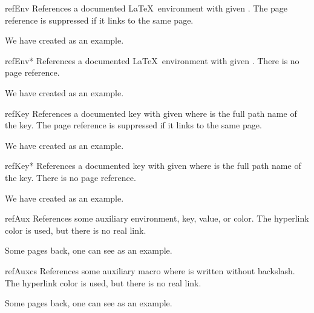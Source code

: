 \begin{docCommand}{refEnv}{}
  References a documented \LaTeX\ environment with given .
  The page reference is suppressed if it links to the same page.
\begin{dispExample}
We have created  as an example.
\end{dispExample}
\end{docCommand}

\begin{docCommand}{refEnv*}{}
  References a documented \LaTeX\ environment with given .
  There is no page reference.
\begin{dispExample}
We have created  as an example.
\end{dispExample}
\end{docCommand}

\clearpage
\begin{docCommand}{refKey}{}
  References a documented key with given  where 
  is the full path name of the key.
  The page reference is suppressed if it links to the same page.
\begin{dispExample}
We have created  as an example.
\end{dispExample}
\end{docCommand}

\begin{docCommand}{refKey*}{}
  References a documented key with given  where 
  is the full path name of the key.
  There is no page reference.
\begin{dispExample}
We have created  as an example.
\end{dispExample}
\end{docCommand}


\begin{docCommand}{refAux}{}
  References some auxiliary environment, key, value, or color. The hyperlink color is
  used, but there is no real link.
\begin{dispExample}
Some pages back, one can see  as an example.
\end{dispExample}
\end{docCommand}

\begin{docCommand}{refAuxcs}{}
  References some auxiliary macro  where  is
  written without backslash. The hyperlink color is
  used, but there is no real link.
\begin{dispExample}
Some pages back, one can see  as an example.
\end{dispExample}
\end{docCommand}


